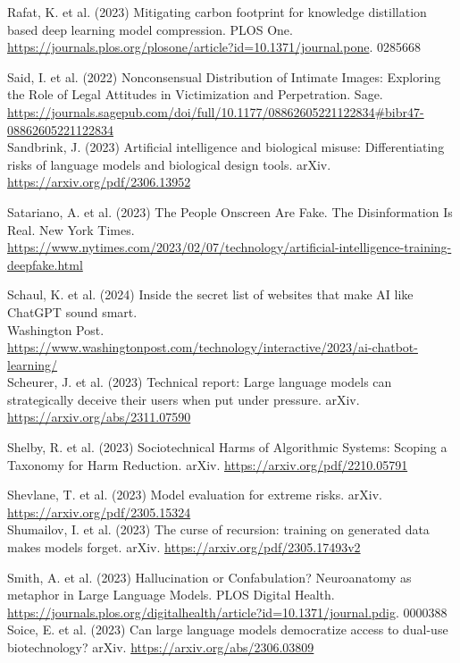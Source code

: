 \documentclass[10pt]{article}
\begin{document}
Rafat, K. et al. (2023) Mitigating carbon footprint for knowledge distillation based deep learning model compression. PLOS One. \href{https://journals.plos.org/plosone/article?id=10.1371/journal.pone}{https://journals.plos.org/plosone/article?id=10.1371/journal.pone}. 0285668

Said, I. et al. (2022) Nonconsensual Distribution of Intimate Images: Exploring the Role of Legal Attitudes in Victimization and Perpetration. Sage.\\
\href{https://journals.sagepub.com/doi/full/10.1177/08862605221122834#bibr47-08862605221122834}{https://journals.sagepub.com/doi/full/10.1177/08862605221122834\#bibr47-08862605221122834}\\
Sandbrink, J. (2023) Artificial intelligence and biological misuse: Differentiating risks of language models and biological design tools. arXiv. \href{https://arxiv.org/pdf/2306.13952}{https://arxiv.org/pdf/2306.13952}

Satariano, A. et al. (2023) The People Onscreen Are Fake. The Disinformation Is Real. New York Times. \href{https://www.nytimes.com/2023/02/07/technology/artificial-intelligence-training-deepfake.html}{https://www.nytimes.com/2023/02/07/technology/artificial-intelligence-training-deepfake.html}

Schaul, K. et al. (2024) Inside the secret list of websites that make AI like ChatGPT sound smart.\\
Washington Post. \href{https://www.washingtonpost.com/technology/interactive/2023/ai-chatbot-learning/}{https://www.washingtonpost.com/technology/interactive/2023/ai-chatbot-learning/}\\
Scheurer, J. et al. (2023) Technical report: Large language models can strategically deceive their users when put under pressure. arXiv. \href{https://arxiv.org/abs/2311.07590}{https://arxiv.org/abs/2311.07590}

Shelby, R. et al. (2023) Sociotechnical Harms of Algorithmic Systems: Scoping a Taxonomy for Harm Reduction. arXiv. \href{https://arxiv.org/pdf/2210.05791}{https://arxiv.org/pdf/2210.05791}

Shevlane, T. et al. (2023) Model evaluation for extreme risks. arXiv. \href{https://arxiv.org/pdf/2305.15324}{https://arxiv.org/pdf/2305.15324}\\
Shumailov, I. et al. (2023) The curse of recursion: training on generated data makes models forget. arXiv. \href{https://arxiv.org/pdf/2305.17493v2}{https://arxiv.org/pdf/2305.17493v2}

Smith, A. et al. (2023) Hallucination or Confabulation? Neuroanatomy as metaphor in Large Language Models. PLOS Digital Health.\\
\href{https://journals.plos.org/digitalhealth/article?id=10.1371/journal.pdig}{https://journals.plos.org/digitalhealth/article?id=10.1371/journal.pdig}. 0000388\\
Soice, E. et al. (2023) Can large language models democratize access to dual-use biotechnology? arXiv. \href{https://arxiv.org/abs/2306.03809}{https://arxiv.org/abs/2306.03809}
\end{document}
